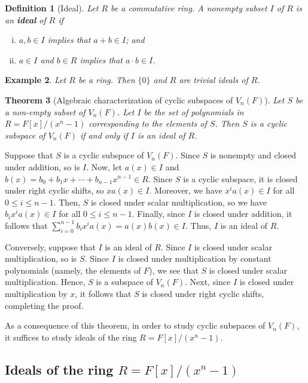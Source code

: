 \documentclass[10pt]{article}
\makeatletter
\theoremstyle{newstyle}
\newtheorem{thm}{Theorem}[subsection]
\newtheorem{defn}[thm]{Definition}
\newtheorem{exmp}[thm]{Example}
\newenvironment{pf}[1][\proofname]{\par
  \pushQED{\qed}%
  \normalfont \topsep0\p@\relax
  \trivlist
  \item[\hskip\labelsep\scshape
  #1\@addpunct{.}]\ignorespaces
}{%
  \popQED\endtrivlist\@endpefalse
}
\makeatother
\begin{document}
\begin{defn}[Ideal]
Let $R$ be a commutative ring. A nonempty subset $I$ of $R$ is an {\bf ideal} of $R$ if
\begin{enumerate}[(i)]
    \item $a, b \in I$ implies that $a+b \in I$; and 
    \item $a \in I$ and $b \in R$ implies that $a \cdot b \in I$. 
\end{enumerate}
\end{defn}

\begin{exmp}
Let $R$ be a ring. Then $\{0\}$ and $R$ are trivial ideals of $R$. 
\end{exmp}

\begin{thm}[Algebraic characterization of cyclic subspaces of $V_n(F)$]
Let $S$ be a non-empty subset of $V_n(F)$. Let $I$ be the set of polynomials 
in $R = F[x]/(x^n-1)$ corresponding to the elements of $S$. Then $S$ is a cyclic subspace of 
$V_n(F)$ if and only if $I$ is an ideal of $R$.
\end{thm}
\begin{pf}
Suppose that $S$ is a cyclic subspace of $V_n(F)$. Since $S$ is nonempty
and closed under addition, so is $I$. Now, let $a(x) \in I$ and $b(x) 
= b_0 + b_1x + \cdots + b_{n-1} x^{n-1} \in R$. Since $S$ is a cyclic subspace, it is closed 
under right cyclic shifts, so $xa(x) \in I$. Moreover, we have $x^ia(x) \in I$ for all 
$0 \leq i \leq n-1$. Then, $S$ is closed under scalar multiplication, so we have 
$b_i x^ia(x) \in I$ for all $0 \leq i \leq n-1$. Finally, since $I$ is closed under 
addition, it follows that $\sum_{i=0}^{n-1} b_i x^i a(x) = a(x) b(x) \in I$. Thus, 
$I$ is an ideal of $R$. 

Conversely, suppose that $I$ is an ideal of $R$. Since $I$ is closed under scalar multiplication, so 
is $S$. Since $I$ is closed under multiplication by constant polynomials (namely, the elements of 
$F$), we see that $S$ is closed under scalar multiplication. Hence, $S$ is a subspace of 
$V_n(F)$. Next, since $I$ is closed under multiplication by $x$, it follows that 
$S$ is closed under right cyclic shifts, completing the proof.
\end{pf}

As a consequence of this theorem, in order to study cyclic subspaces of $V_n(F)$, it suffices 
to study ideals of the ring $R = F[x]/(x^n-1)$. 

\subsection{Ideals of the ring $R = F[x]/(x^n-1)$}
\end{document}

